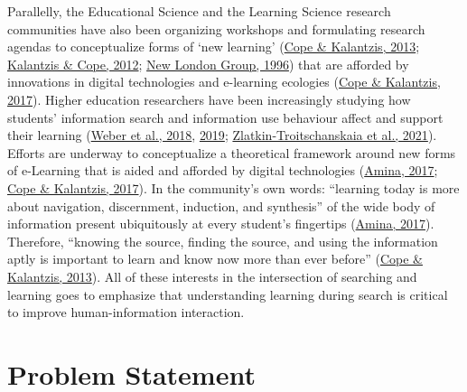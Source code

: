 \documentclass[letterpaper, nobind]{templates/ociamthesis}
\begin{document}
Parallelly, the Educational Science and the Learning Science research communities have also been organizing workshops and formulating research
agendas to conceptualize forms of `new learning' (\protect\hyperlink{ref-cope2013new}{Cope \& Kalantzis, 2013}; \protect\hyperlink{ref-kalantzis2012newa}{Kalantzis \& Cope, 2012}; \protect\hyperlink{ref-newlondon1996pedagogy}{New London Group, 1996}) that are afforded by innovations in digital technologies and e-learning ecologies (\protect\hyperlink{ref-cope2017elearningc}{Cope \& Kalantzis, 2017}).
Higher education researchers have been increasingly studying how students' information search and information use behaviour affect and support their learning (\protect\hyperlink{ref-weber2018can}{Weber et al., 2018}, \protect\hyperlink{ref-weber2019informationseeking}{2019}; \protect\hyperlink{ref-zlatkin2021students}{Zlatkin-Troitschanskaia et al., 2021}).
Efforts are underway to conceptualize a theoretical framework around new forms of e-Learning that is aided and afforded by digital technologies (\protect\hyperlink{ref-amina2017active}{Amina, 2017}; \protect\hyperlink{ref-cope2017elearningc}{Cope \& Kalantzis, 2017}).
In the community's own words: ``learning today is more about navigation, discernment, induction, and synthesis'' of the wide body of information present ubiquitously at every student's fingertips (\protect\hyperlink{ref-amina2017active}{Amina, 2017}).
Therefore, ``knowing the source, finding the source, and using the information aptly is important to learn and know now more than ever before'' (\protect\hyperlink{ref-cope2013new}{Cope \& Kalantzis, 2013}).
All of these interests in the intersection of searching and learning goes to emphasize that understanding learning during search is critical to
improve human-information interaction.

\hypertarget{sec-intro-problem-statement}{%
\section{Problem Statement}\label{sec-intro-problem-statement}}
\end{document}
